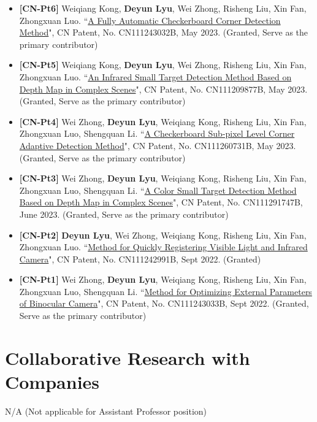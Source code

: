 \documentclass[11pt,a4paper]{moderncv}        %
\begin{document}
\begin{itemize}
    \item \textbf{[CN-Pt6]} Weiqiang Kong, \textbf{Deyun Lyu}, Wei Zhong, Risheng Liu, Xin Fan, Zhongxuan Luo. ``\href{https://patents.google.com/patent/CN111243032B/en}{A Fully Automatic Checkerboard Corner Detection Method}", CN Patent, No. CN111243032B, May 2023. (Granted, Serve as the primary contributor)
    \item \textbf{[CN-Pt5]} Weiqiang Kong, \textbf{Deyun Lyu}, Wei Zhong, Risheng Liu, Xin Fan, Zhongxuan Luo. ``\href{https://patents.google.com/patent/CN111209877B/en}{An Infrared Small Target Detection Method Based on Depth Map in Complex Scenes}", CN Patent, No. CN111209877B, May 2023. (Granted, Serve as the primary contributor)
    \item \textbf{[CN-Pt4]} Wei Zhong, \textbf{Deyun Lyu}, Weiqiang Kong, Risheng Liu, Xin Fan, Zhongxuan Luo, Shengquan Li. ``\href{https://patents.google.com/patent/CN111260731B/en}{A Checkerboard Sub-pixel Level Corner Adaptive Detection Method}", CN Patent, No. CN111260731B, May 2023. (Granted, Serve as the primary contributor)
    \item \textbf{[CN-Pt3]} Wei Zhong, \textbf{Deyun Lyu}, Weiqiang Kong, Risheng Liu, Xin Fan, Zhongxuan Luo, Shengquan Li. ``\href{https://patents.google.com/patent/CN111291747B/en}{A Color Small Target Detection Method Based on Depth Map in Complex Scenes}", CN Patent, No. CN111291747B, June 2023. (Granted, Serve as the primary contributor)
    \item \textbf{[CN-Pt2]} \textbf{Deyun Lyu}, Wei Zhong, Weiqiang Kong, Risheng Liu, Xin Fan, Zhongxuan Luo. ``\href{https://patents.google.com/patent/CN111242991B/en}{Method for Quickly Registering Visible Light and Infrared Camera}", CN Patent, No. CN111242991B, Sept 2022. (Granted)
    \item \textbf{[CN-Pt1]} Wei Zhong, \textbf{Deyun Lyu}, Weiqiang Kong, Risheng Liu, Xin Fan, Zhongxuan Luo, Shengquan Li. ``\href{https://patents.google.com/patent/CN111243033B/en}{Method for Optimizing External Parameters of Binocular Camera}", CN Patent, No. CN111243033B, Sept 2022. (Granted, Serve as the primary contributor)
\end{itemize}

\section{Collaborative Research with Companies}
N/A (Not applicable for Assistant Professor position)
\end{document}
